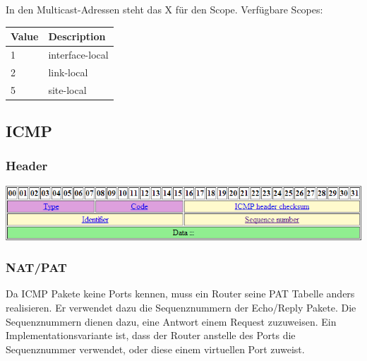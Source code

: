In den Multicast-Adressen steht das X für den Scope. Verfügbare Scopes:

\begin{tabular}[h]{|l|l|}
	\hline
	\textbf{Value} & \textbf{Description} \\
	\hline
	1 & interface-local \\
	2 & link-local \\
	5 & site-local \\
	\hline
\end{tabular}


\subsection{ICMP}

\subsubsection{Header}

\includegraphics[width=\textwidth]{media/ICMPRequest.png}

\subsubsection{NAT/PAT}

Da ICMP Pakete keine Ports kennen, muss ein Router seine PAT Tabelle anders
realisieren. Er verwendet dazu die Sequenznummern der Echo/Reply Pakete. Die Sequenznummern
dienen dazu, eine Antwort einem Request zuzuweisen. Ein Implementationsvariante
ist, dass der Router anstelle des Ports die Sequenznummer verwendet, oder diese
einem virtuellen Port zuweist.

